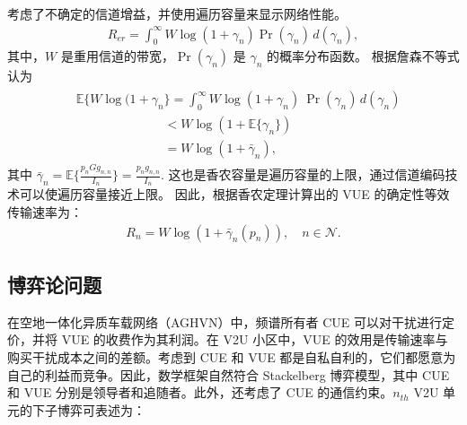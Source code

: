 考虑了不确定的信道增益，并使用遍历容量来显示网络性能。
\begin{eqnarray}\label{8}
R_{er}=\int_{0}^{\infty} W \log(1+\gamma_{n})\Pr(\gamma_{n})\, d(\gamma_{n}),
\end{eqnarray}
其中，$W$ 是重用信道的带宽，$\Pr(\gamma_{n})$ 是 $\gamma_{n}$ 的概率分布函数。 根据詹森不等式
认为
\begin{eqnarray}\label{9}
 \begin{array}{lll}
&\!\!\!\!\!\!\mathbb{E}\{W \log(1+\gamma_{n}\}=\int_{0}^{\infty} W \log(1+\gamma_{n})\ \Pr(\gamma_{n})\, d(\gamma_{n})\\
&\quad\quad\quad\quad\quad\quad\quad\!\!<W\log(1+\mathbb{E}\{\gamma_{n}\})\\
&\quad\quad\quad\quad\quad\quad\quad\!\!=W\log(1+\bar{\gamma}_{n}),
 \end{array}
\end{eqnarray}
其中 $\bar{\gamma}_{n}\!=\mathbb{E}\{\!\frac{p_{n}G g_{n,n}}{I_n}\}
\!=\!\frac{p_{n}g_{n,n}}{I_n}$. 这也是香农容量是遍历容量的上限，通过信道编码技术可以使遍历容量接近上限。
因此，根据香农定理计算出的 VUE 的确定性等效传输速率为：
\begin{eqnarray}\label{10}
R_{n}=W\log(1+\bar{\gamma}_{n}(p_n)),\quad  n\in\mathcal{N}.
\end{eqnarray}

\subsection{博弈论问题}\label{section2-2-1}
在空地一体化异质车载网络（AGHVN）中，频谱所有者 CUE 可以对干扰进行定价，并将 VUE 的收费作为其利润。在 V2U 小区中，VUE 的效用是传输速率与购买干扰成本之间的差额。考虑到 CUE 和 VUE 都是自私自利的，它们都愿意为自己的利益而竞争。因此，数学框架自然符合 Stackelberg 博弈模型，其中 CUE 和 VUE 分别是领导者和追随者。此外，还考虑了 CUE 的通信约束。$n_{th}$ V2U 单元的下子博弈可表述为：

